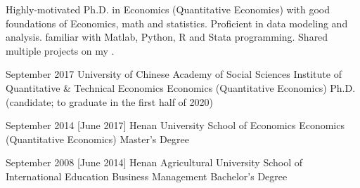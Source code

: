 \documentclass{resume}
\begin{document}
\makeheader

Highly-motivated Ph.D\@. in Economics (Quantitative Economics) with good foundations
of Economics, math and statistics.
Proficient in data modeling and analysis.
familiar with Matlab, Python, R and Stata programming.
Shared multiple projects on my
.


\begin{competences}[10em]
\end{competences}

\begin{educations}
  \education%
    {September 2017}%
    {University of Chinese Academy of Social Sciences}%
    {Institute of Quantitative \& Technical Economics}%
    {Economics (Quantitative Economics)}%
    {Ph.D\@. (candidate; to graduate in the first half of 2020)}

  \separator{0.5em}
  \education%
    {September 2014}%
    [June 2017]%
    {Henan University}%
    {School of Economics}%
    {Economics (Quantitative Economics)}%
    {Master's Degree}

  \separator{0.5em}
  \education%
    {September 2008}%
    [June 2014]%
    {Henan Agricultural University}%
    {School of International Education}%
    {Business Management}%
    {Bachelor's Degree}
\end{educations}
\end{document}

